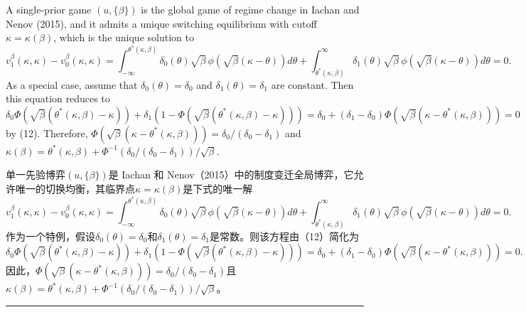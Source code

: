 \documentclass[12pt,a4paper]{article}
\newenvironment{original}
  {\par\medskip\noindent\color{black}\ignorespaces}
  {\par\medskip}
\newenvironment{translation}
  {\par\noindent\color{darkblue}\ignorespaces}
  {\par\medskip\noindent\hrule\par\medskip}
\theoremstyle{definition}
\theoremstyle{remark}
\begin{document}
\begin{original}
A single-prior game $(u, \{\beta\})$ is the global game of regime change in Iachan and Nenov (2015), and it admits a unique switching equilibrium with cutoff $\kappa = \kappa(\beta)$, which is the unique solution to
\[
v_1^\beta(\kappa, \kappa) - v_0^\beta(\kappa, \kappa) = \int_{-\infty}^{\theta^*(\kappa, \beta)} \delta_0(\theta) \sqrt{\beta}\,\phi(\sqrt{\beta}(\kappa - \theta)) d\theta + \int_{\theta^*(\kappa, \beta)}^{\infty} \delta_1(\theta) \sqrt{\beta}\,\phi(\sqrt{\beta}(\kappa - \theta)) d\theta = 0.
\]
As a special case, assume that $\delta_0(\theta) = \delta_0$ and $\delta_1(\theta) = \delta_1$ are constant. Then this equation reduces to
\[
\delta_0 \Phi(\sqrt{\beta}(\theta^*(\kappa, \beta) - \kappa)) + \delta_1(1 - \Phi(\sqrt{\beta}(\theta^*(\kappa, \beta) - \kappa))) = \delta_0 + (\delta_1 - \delta_0)\Phi(\sqrt{\beta}(\kappa - \theta^*(\kappa, \beta))) = 0
\tag{13}
\]
by (12). Therefore, $\Phi(\sqrt{\beta}(\kappa - \theta^*(\kappa, \beta))) = \delta_0/(\delta_0 - \delta_1)$ and $\kappa(\beta) = \theta^*(\kappa, \beta) + \Phi^{-1}(\delta_0/(\delta_0 - \delta_1))/\sqrt{\beta}$.
\end{original}
\begin{translation}
单一先验博弈$(u, \{\beta\})$是 Iachan 和 Nenov（2015）中的制度变迁全局博弈，它允许唯一的切换均衡，其临界点$\kappa = \kappa(\beta)$是下式的唯一解
\[
v_1^\beta(\kappa, \kappa) - v_0^\beta(\kappa, \kappa) = \int_{-\infty}^{\theta^*(\kappa, \beta)} \delta_0(\theta) \sqrt{\beta}\,\phi(\sqrt{\beta}(\kappa - \theta)) d\theta + \int_{\theta^*(\kappa, \beta)}^{\infty} \delta_1(\theta) \sqrt{\beta}\,\phi(\sqrt{\beta}(\kappa - \theta)) d\theta = 0.
\]
作为一个特例，假设$\delta_0(\theta) = \delta_0$和$\delta_1(\theta) = \delta_1$是常数。则该方程由（12）简化为
\[
\delta_0 \Phi(\sqrt{\beta}(\theta^*(\kappa, \beta) - \kappa)) + \delta_1(1 - \Phi(\sqrt{\beta}(\theta^*(\kappa, \beta) - \kappa))) = \delta_0 + (\delta_1 - \delta_0)\Phi(\sqrt{\beta}(\kappa - \theta^*(\kappa, \beta))) = 0.
\tag{13}
\]
因此，$\Phi(\sqrt{\beta}(\kappa - \theta^*(\kappa, \beta))) = \delta_0/(\delta_0 - \delta_1)$且$\kappa(\beta) = \theta^*(\kappa, \beta) + \Phi^{-1}(\delta_0/(\delta_0 - \delta_1))/\sqrt{\beta}$。
\end{translation}
\end{document}
